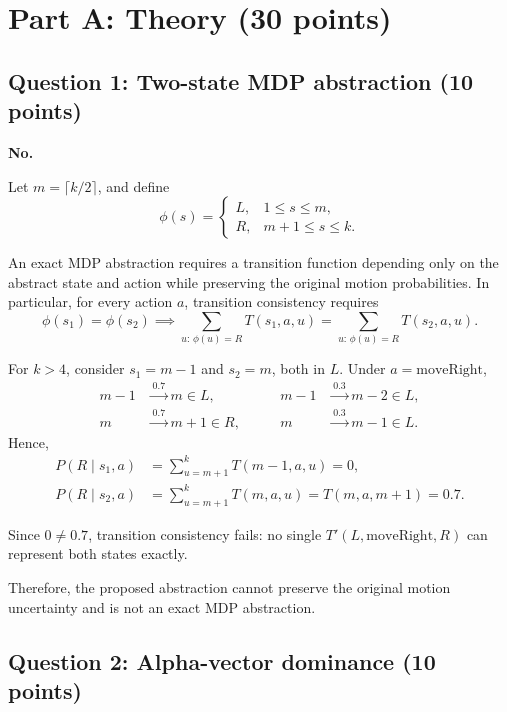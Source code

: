 \documentclass[11pt,a4paper]{article}
\begin{document}
\section*{Part A: Theory (30 points)}

\subsection*{Question 1: Two-state MDP abstraction (10 points)}
\label{sec:a1}
\begingroup
\setlength{\parindent}{0pt}
\setlength{\parskip}{4pt}
\noindent\textbf{No.}

Let $m=\lceil k/2\rceil$, and define
\[
\phi(s)=
\begin{cases}
L, & 1\le s\le m,\\
R, & m+1\le s\le k.
\end{cases}
\]

An exact MDP abstraction requires a transition function depending only
on the abstract state and action while preserving the original motion
probabilities. In particular, for every action $a$, transition consistency requires
\[
\phi(s_1)=\phi(s_2)
\implies
\sum_{u:\,\phi(u)=R}T(s_1,a,u)
=
\sum_{u:\,\phi(u)=R}T(s_2,a,u).
\]

For $k>4$, consider $s_1=m-1$ and $s_2=m$, both in $L$.
Under $a=\mathrm{moveRight}$,
\[
\begin{aligned}
m-1&\xrightarrow{\,0.7\,}m\in L,
&\qquad m-1&\xrightarrow{\,0.3\,}m-2\in L,\\
m&\xrightarrow{\,0.7\,}m+1\in R,
&\qquad m&\xrightarrow{\,0.3\,}m-1\in L.
\end{aligned}
\]
Hence,
\[
\begin{aligned}
P(R\mid s_1,a)
&=\sum_{u=m+1}^{k}T(m-1,a,u)=0,\\
P(R\mid s_2,a)
&=\sum_{u=m+1}^{k}T(m,a,u)
=T(m,a,m+1)=0.7.
\end{aligned}
\]

Since $0\neq0.7$, transition consistency fails:
no single $T'(L,\mathrm{moveRight},R)$ can represent both states exactly.

Therefore, the proposed abstraction cannot preserve the original motion
uncertainty and is not an exact MDP abstraction.
\par
\endgroup

\clearpage
\subsection*{Question 2: Alpha-vector dominance (10 points)}
\label{sec:a2}
\begingroup
\setlength{\parindent}{0pt}
\setlength{\parskip}{4pt}
\end{document}
